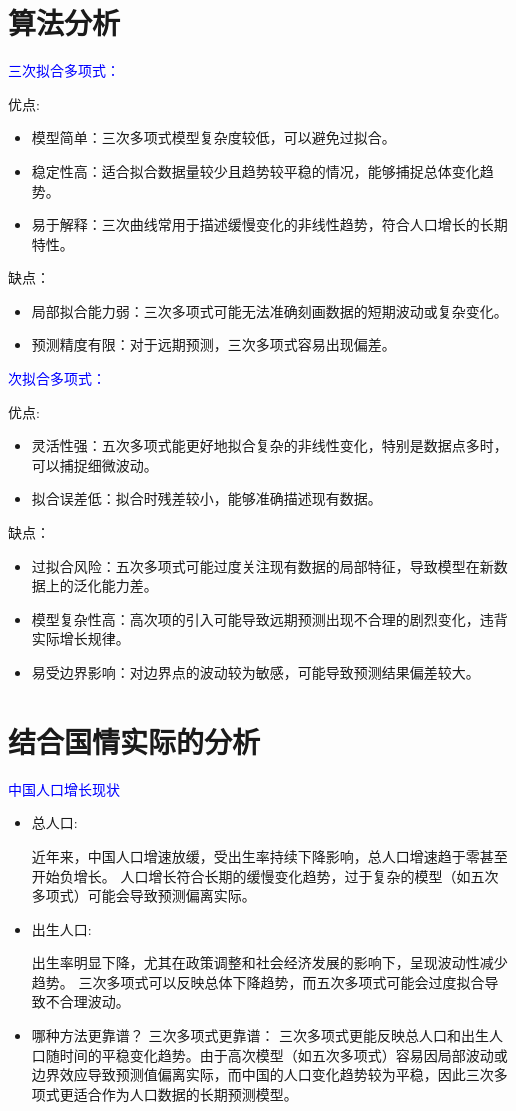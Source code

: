 \documentclass[10pt]{article}
\begin{document}
\section{算法分析}
\textcolor{blue}{三次拟合多项式：}

优点:
\begin{itemize}
  \item 模型简单：三次多项式模型复杂度较低，可以避免过拟合。
  \item 稳定性高：适合拟合数据量较少且趋势较平稳的情况，能够捕捉总体变化趋势。
  \item 易于解释：三次曲线常用于描述缓慢变化的非线性趋势，符合人口增长的长期特性。
\end{itemize}
缺点：
\begin{itemize}
  \item 局部拟合能力弱：三次多项式可能无法准确刻画数据的短期波动或复杂变化。
  \item 预测精度有限：对于远期预测，三次多项式容易出现偏差。
\end{itemize}

\textcolor{blue}{次拟合多项式：}

优点:
\begin{itemize}
  \item 灵活性强：五次多项式能更好地拟合复杂的非线性变化，特别是数据点多时，可以捕捉细微波动。
  \item 拟合误差低：拟合时残差较小，能够准确描述现有数据。
\end{itemize}
缺点：
\begin{itemize}
  \item 过拟合风险：五次多项式可能过度关注现有数据的局部特征，导致模型在新数据上的泛化能力差。
  \item 模型复杂性高：高次项的引入可能导致远期预测出现不合理的剧烈变化，违背实际增长规律。
  \item 易受边界影响：对边界点的波动较为敏感，可能导致预测结果偏差较大。
\end{itemize}

\section{结合国情实际的分析}

\textcolor{blue}{中国人口增长现状}
\begin{itemize}
  \item 总人口:

  近年来，中国人口增速放缓，受出生率持续下降影响，总人口增速趋于零甚至开始负增长。
  人口增长符合长期的缓慢变化趋势，过于复杂的模型（如五次多项式）可能会导致预测偏离实际。
  \item   出生人口:

  出生率明显下降，尤其在政策调整和社会经济发展的影响下，呈现波动性减少趋势。
  三次多项式可以反映总体下降趋势，而五次多项式可能会过度拟合导致不合理波动。
  \item  哪种方法更靠谱？
  三次多项式更靠谱：
  三次多项式更能反映总人口和出生人口随时间的平稳变化趋势。由于高次模型（如五次多项式）容易因局部波动或边界效应导致预测值偏离实际，而中国的人口变化趋势较为平稳，因此三次多项式更适合作为人口数据的长期预测模型。
  
\end{itemize}
\end{document}
